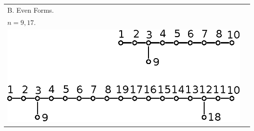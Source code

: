 \begin{enumerate}
\begin{landscape}
{\begin{longtable}{@{}ll@{}}
B. Even Forms. & \\
$n = 9 , 17$. & \\
{\includegraphics{347b.eps}} & \\
\end{longtable}}
\end{landscape}
\relax
\end{enumerate}

